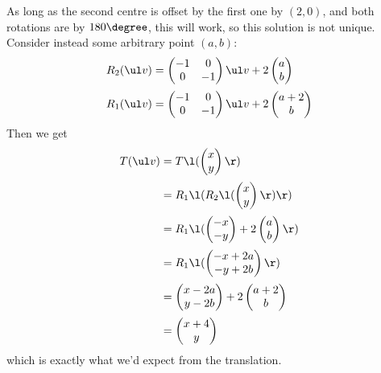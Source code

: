 \documentclass[a4paper]{article}
\begin{document}
As long as the second centre is offset by the first one by $(2,0)$, and both rotations are by $180\degree$, this will work, so this solution is not unique. Consider instead some arbitrary point $(a,b)$:
\begin{align*}
R_2(\ul v) &= \begin{pmatrix} -1 & 0 \\ 0 & -1 \end{pmatrix} \ul v + 2 \begin{pmatrix} a \\ b \end{pmatrix} \\[0.5ex]
R_1(\ul v) &= \begin{pmatrix} -1 & 0 \\ 0 & -1 \end{pmatrix} \ul v + 2 \begin{pmatrix} a + 2 \\ b \end{pmatrix}
\end{align*}
Then we get
\begin{align*}
T(\ul v) &= T\l( \begin{pmatrix} x \\ y \end{pmatrix} \r) \\[0.5ex]
&= R_1 \l( R_2 \l( \begin{pmatrix} x \\ y \end{pmatrix} \r) \r) \\[0.5ex]
&= R_1 \l( \begin{pmatrix} -x \\ -y \end{pmatrix} + 2 \begin{pmatrix} a \\ b \end{pmatrix} \r) \\[0.5ex]
&= R_1 \l( \begin{pmatrix} -x + 2a \\ -y + 2b \end{pmatrix} \r) \\[0.5ex]
&= \begin{pmatrix} x - 2a \\ y - 2b \end{pmatrix} + 2 \begin{pmatrix} a + 2 \\ b \end{pmatrix} \\[0.5ex]
&= \begin{pmatrix} x + 4 \\ y \end{pmatrix}
\end{align*}
which is exactly what we'd expect from the translation.

\end{document}
